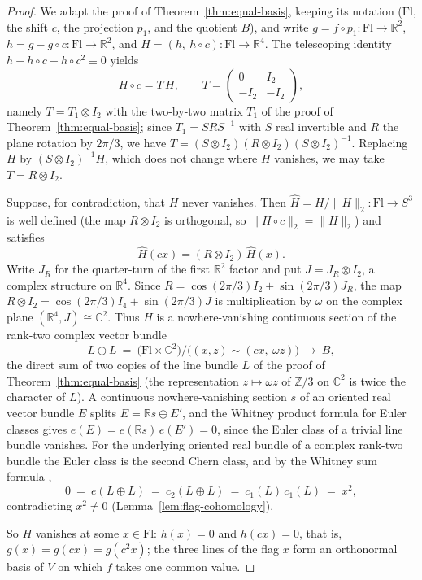 \documentclass[11pt,a4paper]{article}
\begin{document}
\begin{proof}
We adapt the proof of Theorem~\ref{thm:equal-basis}, keeping its notation
($\mathrm{Fl}$, the shift $c$, the projection $p_1$, and the quotient $B$),
and write $g=f\circ p_1\colon\mathrm{Fl}\to\mathbb R^2$,
$h=g-g\circ c\colon\mathrm{Fl}\to\mathbb R^2$, and
$H=(h,\ h\circ c)\colon\mathrm{Fl}\to\mathbb R^4$. The telescoping identity
$h+h\circ c+h\circ c^2\equiv0$ yields
\[
H\circ c=T\,H,
\qquad
T=\begin{pmatrix}0&I_2\\-I_2&-I_2\end{pmatrix},
\]
namely $T=T_1\otimes I_2$ with the two-by-two matrix $T_1$ of the proof of
Theorem~\ref{thm:equal-basis}; since $T_1=SRS^{-1}$ with $S$ real invertible
and $R$ the plane rotation by $2\pi/3$, we have
$T=(S\otimes I_2)(R\otimes I_2)(S\otimes I_2)^{-1}$. Replacing $H$ by
$(S\otimes I_2)^{-1}H$, which does not change where $H$ vanishes, we may take
$T=R\otimes I_2$.

Suppose, for contradiction, that $H$ never vanishes. Then
$\widehat H=H/\|H\|_2\colon\mathrm{Fl}\to S^3$ is well defined (the map
$R\otimes I_2$ is orthogonal, so $\|H\circ c\|_2=\|H\|_2$) and satisfies
\[
\widehat H(cx)=(R\otimes I_2)\,\widehat H(x).
\]
Write $J_R$ for the quarter-turn of the first $\mathbb R^2$ factor and put
$J=J_R\otimes I_2$, a complex structure on $\mathbb R^4$. Since
$R=\cos(2\pi/3)I_2+\sin(2\pi/3)J_R$, the map
$R\otimes I_2=\cos(2\pi/3)I_4+\sin(2\pi/3)J$ is multiplication by $\omega$
on the complex plane $(\mathbb R^4,J)\cong\mathbb C^2$. Thus $\widehat H$ is
a nowhere-vanishing continuous section of the rank-two complex vector bundle
\[
L\oplus L\ =\ \bigl(\mathrm{Fl}\times\mathbb C^2\bigr)\big/
\bigl((x,z)\sim(cx,\ \omega z)\bigr)
\ \longrightarrow\ B,
\]
the direct sum of two copies of the line bundle $L$ of the proof of
Theorem~\ref{thm:equal-basis} (the representation $z\mapsto\omega z$ of
$\mathbb Z/3$ on $\mathbb C^2$ is twice the character of $L$). A continuous
nowhere-vanishing section $s$ of an oriented real vector bundle $E$ splits
$E=\mathbb Rs\oplus E'$, and the Whitney product formula for Euler classes
\cite{MilnorStasheff1974} gives $e(E)=e(\mathbb Rs)\,e(E')=0$, since the
Euler class of a trivial line bundle vanishes. For the underlying oriented
real bundle of a complex rank-two bundle the Euler class is the second Chern
class, and by the Whitney sum formula \cite{MilnorStasheff1974},
\[
0\ =\ e(L\oplus L)\ =\ c_2(L\oplus L)\ =\ c_1(L)\,c_1(L)\ =\ x^2,
\]
contradicting $x^2\ne0$ (Lemma~\ref{lem:flag-cohomology}).

So $H$ vanishes at some $x\in\mathrm{Fl}$: $h(x)=0$ and $h(cx)=0$, that is,
$g(x)=g(cx)=g(c^2x)$; the three lines of the flag $x$ form an orthonormal
basis of $V$ on which $f$ takes one common value.
\end{proof}
\end{document}

